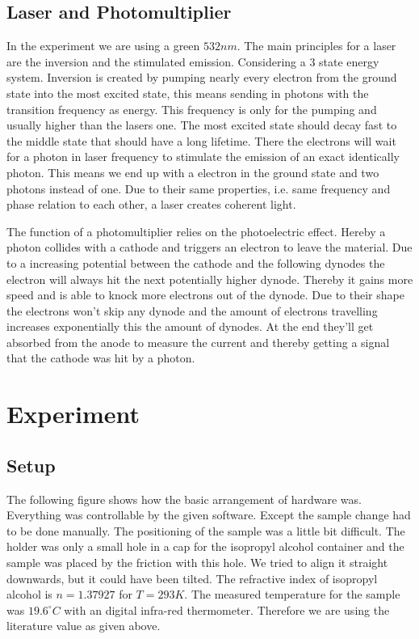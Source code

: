 \documentclass[]{article}
\begin{document}
\subsection{Laser and Photomultiplier}
In the experiment we are using a green $532nm$. The main principles for a laser are the inversion and the stimulated emission. Considering a 3 state energy system. Inversion is created by pumping nearly every electron from the ground state into the most excited state, this means sending in photons with the transition frequency as energy. This frequency is only for the pumping and usually higher than the lasers one. The most excited state should decay fast to the middle state that should have a long lifetime. There the electrons will wait for a photon in laser frequency to stimulate the emission of an exact identically photon. This means we end up with a electron in the ground state and two photons instead of one. Due to their same properties, i.e. same frequency and phase relation to each other, a laser creates coherent light.

The function of a photomultiplier relies on the photoelectric effect. Hereby a photon collides with a cathode and triggers an electron to leave the material.
Due to a increasing potential between the cathode and the following dynodes the electron will always hit the next potentially higher dynode. Thereby it gains more speed and is able to knock more electrons out of the dynode. Due to their shape the electrons won't skip any dynode and the amount of electrons travelling increases exponentially this the amount of dynodes. At the end they'll get absorbed from the anode to measure the current and thereby getting a signal that the cathode was hit by a photon.

\newpage
\section{Experiment}
\subsection{Setup}
The following figure shows how the basic arrangement of hardware was. Everything was controllable by the given software. Except the sample change had to be done manually. The positioning of the sample was a little bit difficult. The holder was only a small hole in a cap for the isopropyl alcohol container and the sample was placed by the friction with this hole. We tried to align it straight downwards, but it could have been tilted. The refractive index of isopropyl alcohol is $n=1.37927$ for $T=293K$. The measured temperature for the sample was $19.6 ^\circ C$ with an digital infra-red thermometer. Therefore we are using the literature value as given above.
\end{document}
